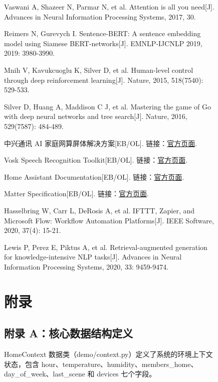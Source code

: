 \documentclass[12pt,a4paper,oneside]{ctexrep}
\begin{document}
\begin{figure}[H]
\begingroup
\sloppy
\begin{enumerate}[label={[}1{]}]
    \item Vaswani A, Shazeer N, Parmar N, et al. Attention is all you need[J]. Advances in Neural Information Processing Systems, 2017, 30.
    \item Reimers N, Gurevych I. Sentence-BERT: A sentence embedding model using Siamese BERT-networks[J]. EMNLP-IJCNLP 2019, 2019: 3980-3990.
    \item Mnih V, Kavukcuoglu K, Silver D, et al. Human-level control through deep reinforcement learning[J]. Nature, 2015, 518(7540): 529-533.
    \item Silver D, Huang A, Maddison C J, et al. Mastering the game of Go with deep neural networks and tree search[J]. Nature, 2016, 529(7587): 484-489.
    \item 中兴通讯 AI 家庭网算屏体解决方案[EB/OL]. 链接：\href{https://www.zte.com.cn/china/hottopics/ai_home.html}{官方页面}.
    \item Vosk Speech Recognition Toolkit[EB/OL]. 链接：\href{https://alphacephei.com/vosk/}{官方页面}.
    \item Home Assistant Documentation[EB/OL]. 链接：\href{https://www.home-assistant.io/docs/}{官方页面}.
    \item Matter Specification[EB/OL]. 链接：\href{https://csa-iot.org/develop-with-matter/matter-specification/}{官方页面}.
    \item Hasselbring W, Carr L, DeRosis A, et al. IFTTT, Zapier, and Microsoft Flow: Workflow Automation Platforms[J]. IEEE Software, 2020, 37(4): 15-21.
    \item Lewis P, Perez E, Piktus A, et al. Retrieval-augmented generation for knowledge-intensive NLP tasks[J]. Advances in Neural Information Processing Systems, 2020, 33: 9459-9474.
\end{enumerate}
\endgroup

\chapter*{附录}

\section*{附录 A：核心数据结构定义}

HomeContext 数据类（demo/context.py）定义了系统的环境上下文状态，包含 hour、temperature、humidity、members\_home、day\_of\_week、last\_scene 和 devices 七个字段。


\end{figure}
\end{document}
